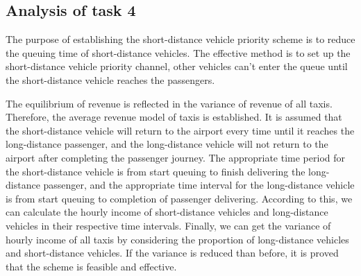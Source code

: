 \subsection{Analysis of task 4}

\par The purpose of establishing the short-distance vehicle priority scheme is to reduce the queuing time of short-distance vehicles. The effective method is to set up the short-distance vehicle priority channel, other vehicles can't enter the queue until the short-distance vehicle reaches the passengers. 

The equilibrium of revenue is reflected in the variance of revenue of all taxis. Therefore, the average revenue model of taxis is established. It is assumed that the short-distance vehicle will return to the airport every time until it reaches the long-distance passenger, and the long-distance vehicle will not return to the airport after completing the passenger journey. The appropriate time period for the short-distance vehicle is from start queuing to finish delivering the long-distance passenger, and the appropriate time interval for the long-distance vehicle is from start queuing to completion of passenger delivering. According to this, we can calculate the hourly income of short-distance vehicles and long-distance vehicles in their respective time intervals. Finally, we can get the variance of hourly income of all taxis by considering the proportion of long-distance vehicles and short-distance vehicles. If the variance is reduced than before, it is proved that the scheme is feasible and effective.